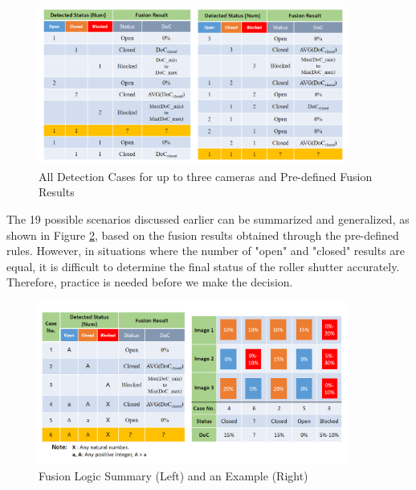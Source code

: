 \begin{figure}[h]
  \centering
  \includegraphics[width=0.9\textwidth]{Figures/Fusion Cases.png}
  \caption{All Detection Cases for up to three cameras and Pre-defined Fusion Results}
  \label{fig:13}  
\end{figure}

The 19 possible scenarios discussed earlier can be summarized and generalized, as shown in Figure \ref{fig:14}, based on the fusion results obtained through the pre-defined rules. However, in situations where the number of "open" and "closed" results are equal, it is difficult to determine the final status of the roller shutter accurately. Therefore, practice is needed before we make the decision.

\begin{figure}[h]
  \centering
  \includegraphics[width=0.9\textwidth]{Figures/Fusion.png}
  \caption{Fusion Logic Summary (Left) and an Example (Right) }
  \label{fig:14}  
\end{figure}
